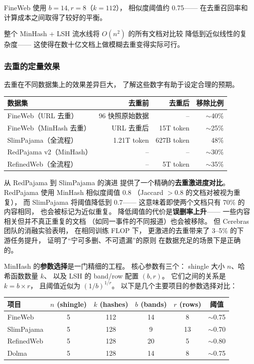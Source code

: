 FineWeb 使用 $b = 14, r = 8$（$k = 112$），
相似度阈值约 0.75——
在去重召回率和计算成本之间取得了较好的平衡。

整个 MinHash + LSH 流水线将 $O(n^2)$ 的所有文档对比较
降低到近似线性的复杂度——
这使得在数十亿文档上做模糊去重变得实际可行。

\subsubsection{去重的定量效果}

去重在不同数据集上的效果差异巨大，
了解这些数字有助于设定合理的预期。

\begin{center}
\small
\begin{tabular}{lrrr}
\hline
\textbf{数据集} & \textbf{去重前} & \textbf{去重后} & \textbf{移除比例} \\
\hline
FineWeb（URL 去重） & 96 快照原始数据 & -- & $\sim$40\% \\
FineWeb（MinHash 去重） & URL 去重后 & 15T token & $\sim$25\% \\
SlimPajama（全流程） & 1.21T token & 627B token & 48\% \\
RedPajama v2（MinHash） & -- & -- & $\sim$30\% \\
RefinedWeb（全流程） & -- & 5T token & $\sim$35\% \\
\hline
\end{tabular}
\end{center}

从 RedPajama 到 SlimPajama 的演进
提供了一个精确的\textbf{去重激进度对比}。
RedPajama 使用 MinHash 相似度阈值 0.8
（Jaccard $> 0.8$ 的文档对被视为重复），
而 SlimPajama 将阈值降低到 0.7——
这意味着即使两个文档只有 70\% 的内容相同，
也会被标记为近似重复。
降低阈值的代价是\textbf{误删率上升}——
一些内容相关但并不真正重复的文档
（如同一事件的不同报道）也会被移除。
但 Cerebras 团队的消融实验表明，
在相同训练 FLOP 下，
更激进的去重带来了 3--5\% 的下游任务提升，
证明了``宁可多删、不可遗漏''的原则
在数据充足的场景下是正确的。

MinHash 的\textbf{参数选择}是一门精细的工程。
核心参数有三个：
shingle 大小 $n$、哈希函数数量 $k$、
以及 LSH 的 band/row 配置 $(b, r)$。
它们之间的关系是 $k = b \times r$，
且阈值近似为 $(1/b)^{1/r}$。
以下是几个主要项目的参数选择对比：

\begin{center}
\small
\begin{tabular}{lccccc}
\hline
\textbf{项目} & $n$ (shingle) & $k$ (hashes) & $b$ (bands) & $r$ (rows) & 阈值 \\
\hline
FineWeb & 5 & 112 & 14 & 8 & $\sim$0.75 \\
SlimPajama & 5 & 128 & 9 & 13 & $\sim$0.70 \\
RefinedWeb & 5 & 128 & 20 & 5 & $\sim$0.80 \\
Dolma & 5 & 128 & 14 & 8 & $\sim$0.75 \\
\hline
\end{tabular}
\end{center}

